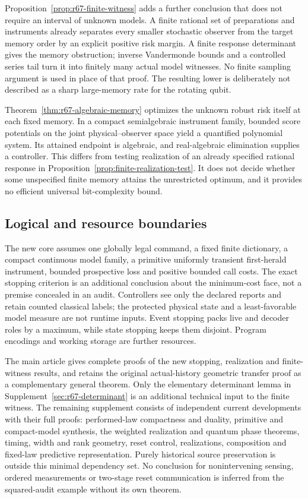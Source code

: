 Proposition~\ref{prop:r67-finite-witness} adds a further conclusion that does not require an interval of unknown models. A finite rational set of preparations and instruments already separates every smaller stochastic observer from the target memory order by an explicit positive risk margin. A finite response determinant gives the memory obstruction; inverse Vandermonde bounds and a controlled series tail turn it into finitely many actual model witnesses. No finite sampling argument is used in place of that proof. The resulting lower is deliberately not described as a sharp large-memory rate for the rotating qubit.

Theorem~\ref{thm:r67-algebraic-memory} optimizes the unknown robust risk itself at each fixed memory. In a compact semialgebraic instrument family, bounded score potentials on the joint physical--observer space yield a quantified polynomial system. Its attained endpoint is algebraic, and real-algebraic elimination supplies a controller. This differs from testing realization of an already specified rational response in Proposition~\ref{prop:finite-realization-test}. It does not decide whether some unspecified finite memory attains the unrestricted optimum, and it provides no efficient universal bit-complexity bound.

\subsection*{Logical and resource boundaries}
The new core assumes one globally legal command, a fixed finite dictionary, a compact continuous model family, a primitive uniformly transient first-herald instrument, bounded prospective loss and positive bounded call costs. The exact stopping criterion is an additional conclusion about the minimum-cost face, not a premise concealed in an audit. Controllers see only the declared reports and retain counted classical labels; the protected physical state and a least-favorable model measure are not runtime inputs. Event stopping packs live and decoder roles by a maximum, while state stopping keeps them disjoint. Program encodings and working storage are further resources.

The main article gives complete proofs of the new stopping, realization and finite-witness results, and retains the original actual-history geometric transfer proof as a complementary general theorem. Only the elementary determinant lemma in Supplement~\ref{sec:r67-determinant} is an additional technical input to the finite witness. The remaining supplement consists of independent current developments with their full proofs: performed-law compactness and duality, primitive and compact-model synthesis, the weighted realization and quantum phase theorems, timing, width and rank geometry, reset control, realizations, composition and fixed-law predictive representation. Purely historical source preservation is outside this minimal dependency set. No conclusion for nonintervening sensing, ordered measurements or two-stage reset communication is inferred from the squared-audit example without its own theorem.
